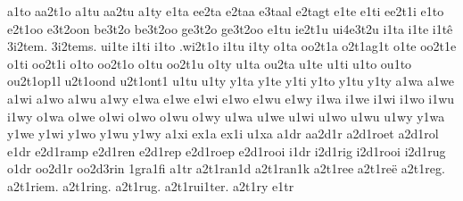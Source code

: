 {%
a1to
aa2t1o
a1tu
aa2tu
a1ty
%
e1ta
ee2ta
e2taa
e3taal
e2tagt
e1te
e1ti
ee2t1i
e1to
e2t1oo
e3t2oon
be3t2o
be3t2oo
ge3t2o
ge3t2oo
e1tu
ie2t1u
ui4e3t2u
%
i1ta
i1te
i1tê
3i2tem.
3i2tems.
ui1te
i1ti
i1to
.wi2t1o
i1tu
i1ty
%
o1ta
oo2t1a
o2t1ag1t
o1te
oo2t1e
o1ti
oo2t1i
o1to
oo2t1o
o1tu
oo2t1u
o1ty
%
u1ta
ou2ta
u1te
u1ti
u1to
ou1to
ou2t1op1l
u2t1oond
u2t1ont1
u1tu
u1ty
%
y1ta
y1te
y1ti
y1to
y1tu
y1ty
%
a1wa
a1we
a1wi
a1wo
a1wu
a1wy
%
e1wa
e1we
e1wi
e1wo
e1wu
e1wy
%
i1wa
i1we
i1wi
i1wo
i1wu
i1wy
%
o1wa
o1we
o1wi
o1wo
o1wu
o1wy
%
u1wa
u1we
u1wi
u1wo
u1wu
u1wy
%
y1wa
y1we
y1wi
y1wo
y1wu
y1wy
%
a1xi
ex1a
ex1i
u1xa
%
%
%
a1dr
aa2d1r
a2d1roet
a2d1rol
%
e1dr
e2d1ramp
e2d1ren
e2d1rep
e2d1roep
e2d1rooi
%
i1dr
i2d1rig
i2d1rooi
i2d1rug
%
o1dr
oo2d1r
oo2d3rin
%
%
%
1gra1fi
%
%
a1tr
a2t1ran1d
a2t1ran1k
a2t1ree
a2t1reë
a2t1reg.
a2t1riem.
a2t1ring.
a2t1rug.
a2t1rui1ter.
a2t1ry
%
e1tr
}
